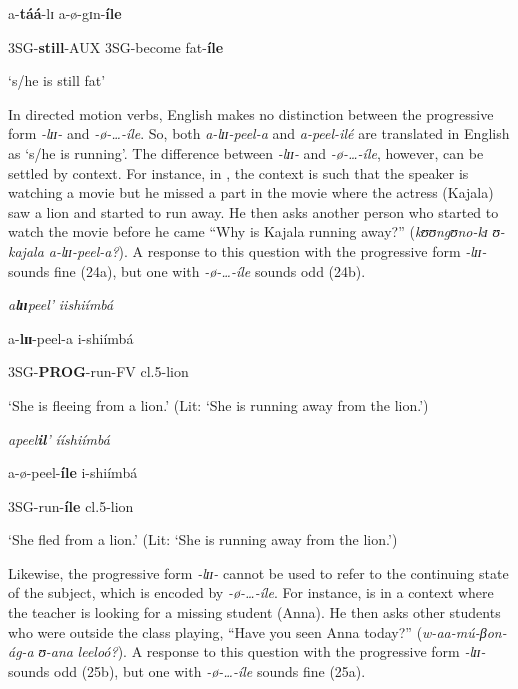 \documentclass[output=paper]{langscibook}
\begin{document}
  a-\textbf{táá}-lɪ            a-ø-gɪn-\textbf{íle}

  3SG-\textbf{still}-AUX 3SG-become fat-\textbf{íle}

  ‘s/he is still fat’
\z


In directed motion verbs, English makes no distinction between the progressive form \textit{-lɪɪ}\textit{-} and \textit{-ø}\textit{-…-íle}. So, both \textit{a-lɪɪ}\textit{-peel-a} and \textit{a-peel-ilé} are translated in English as ‘s/he is running’. The difference between \textit{-lɪɪ}\textit{-} and \textit{-ø}\textit{-…-íle}, however, can be settled by context. For instance, in , the context is such that the speaker is watching a movie but he missed a part in the movie where the actress (Kajala) saw a lion and started to run away. He then asks another person who started to watch the movie before he came “Why is Kajala running away?” (\textit{kʊʊ}\textit{ngʊ}\textit{no-kɪ} \textit{ʊ}\textit{-kajala a-l}\textit{ɪɪ-peel-a?}). A response to this question with the progressive form \textit{-lɪɪ}\textit{-} sounds fine (24a), but one with \textit{-ø}\textit{-…-íle} sounds odd (24b). 

\ea
\ea \textit{a}\textbf{\textit{l}}\textbf{\textit{ɪɪ}}\textit{peel’}                  \textit{iishiímbá}

 a-\textbf{lɪɪ}-peel-a              i-shiímbá

 3SG-\textbf{PROG}-run-FV cl.5-lion

 ‘She is fleeing from a lion.’ (Lit: ‘She is running away from the lion.’)

\ex *\textit{apeel}\textbf{\textit{il}}\textit{’}       \textit{ííshiímbá}

   a-ø-peel-\textbf{íle} i-shiímbá

   3SG-run-\textbf{íle}   cl.5-lion

  ‘She fled from a lion.’ (Lit: ‘She is running away from the lion.’)
\z
\z

Likewise, the progressive form \textit{-lɪɪ}\textit{-} cannot be used to refer to the continuing state of the subject, which is encoded by \textit{-ø}\textit{-…-íle}. For instance,  is in a context where the teacher is looking for a missing student (Anna). He then asks other students who were outside the class playing, “Have you seen Anna today?” (\textit{w-aa-mú-βon-ág-a} \textit{ʊ-ana} \textit{leeloó?}). A response to this question with the progressive form \textit{-lɪɪ}\textit{-} sounds odd (25b), but one with \textit{-ø}\textit{-…-íle} sounds fine (25a).
\end{document}
